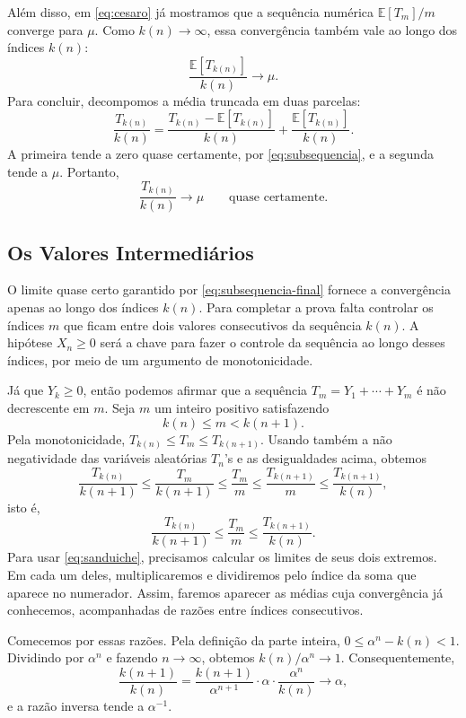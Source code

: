 \documentclass[12pt,portuguese]{article}
\theoremstyle{definition}
\theoremstyle{plainexercise}
\theoremstyle{starredexercise}
\theoremstyle{definition}
\begin{document}
Além disso, em \eqref{eq:cesaro} já mostramos que a sequência numérica
$\mathbb{E}[T_m]/m$ converge para $\mu$. Como $k(n)\to\infty$, essa
convergência também vale ao longo dos índices $k(n)$:
\[
\frac{\mathbb{E}[T_{k(n)}]}{k(n)}\longrightarrow\mu.
\]
Para concluir, decompomos a média truncada em duas parcelas:
\[
\frac{T_{k(n)}}{k(n)}
=\frac{T_{k(n)}-\mathbb{E}[T_{k(n)}]}{k(n)}
+\frac{\mathbb{E}[T_{k(n)}]}{k(n)}.
\]
A primeira tende a zero quase certamente, por \eqref{eq:subsequencia}, e a
segunda tende a $\mu$. Portanto,
\begin{equation}\label{eq:subsequencia-final}
\frac{T_{k(n)}}{k(n)}\longrightarrow\mu
\qquad\text{quase certamente.}
\end{equation}

\subsection{Os Valores Intermediários}\label{subsec:intermediarios}

O limite quase certo garantido por \eqref{eq:subsequencia-final} fornece
a convergência apenas ao longo dos índices $k(n)$.
Para completar a prova falta controlar os índices $m$ que ficam entre dois valores
consecutivos da sequência $k(n)$. A hipótese $X_n\geqslant0$ será a chave para fazer o controle
da sequência ao longo desses índices, por meio de um argumento de monotonicidade.

Já que $Y_k\geqslant0$, então podemos afirmar que a sequência $T_m=Y_1+\cdots+Y_m$ é não decrescente em
$m$. Seja $m$ um inteiro positivo satisfazendo
\[
k(n)\leqslant m<k(n+1).
\]
Pela monotonicidade, $T_{k(n)}\leqslant T_m\leqslant T_{k(n+1)}$. Usando
também a não negatividade das variáveis aleatórias $T_n$'s e as desigualdades acima, obtemos
\[
\frac{T_{k(n)}}{k(n+1)}
\leqslant
\frac{T_m}{k(n+1)}
\leqslant
\frac{T_m}{m}
\leqslant
\frac{T_{k(n+1)}}{m}
\leqslant
\frac{T_{k(n+1)}}{k(n)},
\]
isto é,
\begin{equation}\label{eq:sanduiche}
\frac{T_{k(n)}}{k(n+1)}
\leqslant
\frac{T_m}{m}
\leqslant
\frac{T_{k(n+1)}}{k(n)}.
\end{equation}
Para usar \eqref{eq:sanduiche}, precisamos calcular os limites de seus dois
extremos. Em cada um deles, multiplicaremos e dividiremos pelo índice da
soma que aparece no numerador. Assim, faremos aparecer as médias cuja
convergência já conhecemos, acompanhadas de razões entre índices
consecutivos.

Comecemos por essas razões. Pela definição da parte inteira,
$0\leqslant\alpha^n-k(n)<1$. Dividindo por $\alpha^n$ e fazendo
$n\to\infty$, obtemos $k(n)/\alpha^n\to1$. Consequentemente,
\[
\frac{k(n+1)}{k(n)}
=
\frac{k(n+1)}{\alpha^{n+1}}\cdot\alpha\cdot\frac{\alpha^n}{k(n)}
\longrightarrow\alpha,
\]
e a razão inversa tende a $\alpha^{-1}$.
\end{document}
